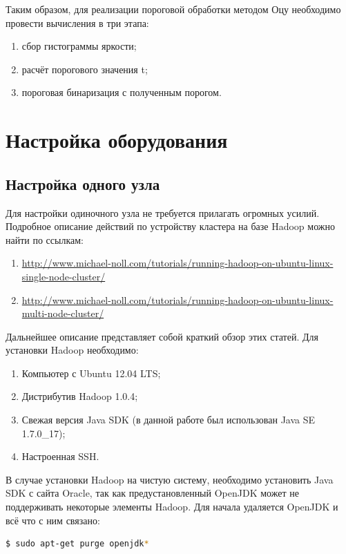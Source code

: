 \documentclass[12pt,a4paper]{extarticle} %
\begin{document}
    Таким образом, для реализации пороговой обработки методом Оцу необходимо провести вычисления в три этапа:
\begin{enumerate}
    \item сбор гистограммы яркости;\\
    \item расчёт порогового значения t;\\
    \item пороговая бинаризация с полученным порогом.
\end{enumerate}

\newpage
\section{Настройка оборудования} \label{sec:TuningCluster}
\subsection{Настройка одного узла}

    Для настройки одиночного узла не требуется прилагать огромных усилий. Подробное описание действий по устройству кластера на базе Hadoop можно найти по ссылкам:
\begin{enumerate}
    \item[] \href{http://www.michael-noll.com/tutorials/running-hadoop-on-ubuntu-linux-single-node-cluster/}{http://www.michael-noll.com/tutorials/running-hadoop-on-ubuntu-linux-single-node-cluster/}
    \item[] \href{http://www.michael-noll.com/tutorials/running-hadoop-on-ubuntu-linux-multi-node-cluster/}{http://www.michael-noll.com/tutorials/running-hadoop-on-ubuntu-linux-multi-node-cluster/}
\end{enumerate}

    Дальнейшее описание представляет собой краткий обзор этих статей. Для установки Hadoop необходимо:
\begin{enumerate}
    \item Компьютер с Ubuntu 12.04 LTS;
    \item Дистрибутив Hadoop 1.0.4;
    \item Свежая версия Java SDK (в данной работе был использован Java SE 1.7.0\_17);
    \item Настроенная SSH.
\end{enumerate}

    В случае установки Hadoop на чистую систему, необходимо установить Java SDK с сайта Oracle, так как предустановленный OpenJDK может не поддерживать некоторые элементы Hadoop.
\noindent Для начала удаляется OpenJDK и всё что с ним связано:
\begin{lstlisting}[language=sh]
    $ sudo apt-get purge openjdk*
\end{lstlisting}
\end{document}
